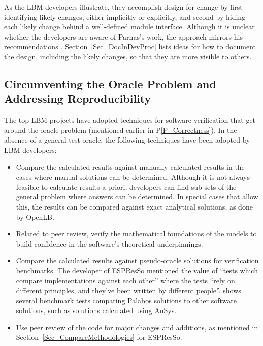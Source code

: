 \documentclass[final, 3p, times, authoryear]{elsarticle}
\newcommand{\ppref}[1]{P\ref{#1}}
\begin{document}
As the LBM developers illustrate, they accomplish design for change by first
identifying likely changes, either implicitly or explicitly, and second by
hiding each likely change behind a well-defined module interface.  Although it
is unclear whether the developers are aware of Parnas's work, the approach
mirrors his recommendations \citep{Parnas1972a}. Section~\ref{Sec_DocInDevProc}
lists ideas for how to document the design, including the likely changes, so
that they are more visible to others.

\subsection{Circumventing the Oracle Problem and Addressing Reproducibility}
\label{SecReproducibility}

The top LBM projects have adopted techniques for software verification that get
around the oracle problem (mentioned earlier in \ppref{P_Correctness}). In the
absence of a general test oracle, the following techniques have been adopted by
LBM developers:

\begin{itemize}
	\item Compare the calculated results against manually calculated results in
	the cases where manual solutions can be determined.  Although it is not
	always feasible to calculate results a priori, developers can find sub-sets
	of the general problem where answers can be determined.  In special cases
	that allow this, the results can be compared against exact analytical
	solutions, as done by OpenLB.
	\item Related to peer review, verify the mathematical foundations of the
	models to build confidence in the software's theoretical underpinnings.
	\item Compare the calculated results against pseudo-oracle solutions for
	verification benchmarks. The developer of ESPResSo mentioned the value of
	``tests which compare implementations against each other'' where the tests
	``rely on different principles, and they've been written by different
	people''. \citet{latt2021palabos} shows several benchmark tests comparing
	Palabos solutions to other software solutions, such as solutions calculated
	using AnSys.
	\item Use peer review of the code for major changes and additions, as
	mentioned in Section~\ref{Sec_CompareMethodologies} for ESPResSo. 
\end{itemize}
\end{document}
